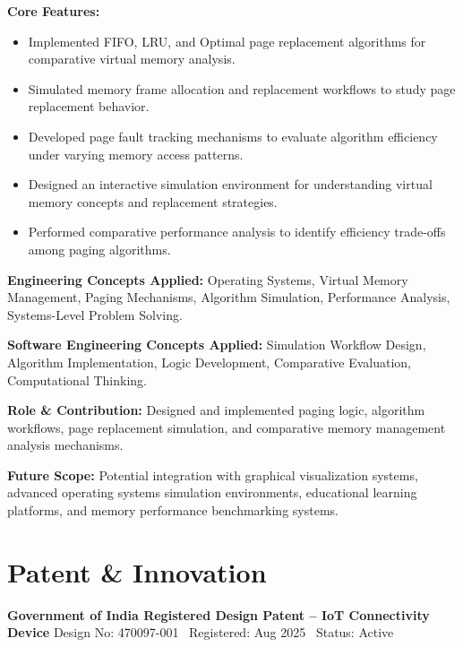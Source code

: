 \documentclass[a4paper,11pt]{article}
\newcommand{\resumeProject}[2]{
\textbf{#1} \hfill {\small #2}
}
\begin{document}
\textbf{Core Features:}
\begin{itemize}

    \item Implemented FIFO, LRU, and Optimal page replacement algorithms for comparative virtual memory analysis.

    \item Simulated memory frame allocation and replacement workflows to study page replacement behavior.

    \item Developed page fault tracking mechanisms to evaluate algorithm efficiency under varying memory access patterns.

    \item Designed an interactive simulation environment for understanding virtual memory concepts and replacement strategies.

    \item Performed comparative performance analysis to identify efficiency trade-offs among paging algorithms.

\end{itemize}

\textbf{Engineering Concepts Applied:}
Operating Systems, Virtual Memory Management, Paging Mechanisms, Algorithm Simulation, Performance Analysis, Systems-Level Problem Solving.

\textbf{Software Engineering Concepts Applied:}
Simulation Workflow Design, Algorithm Implementation, Logic Development, Comparative Evaluation, Computational Thinking.

\textbf{Role \& Contribution:}
Designed and implemented paging logic, algorithm workflows, page replacement simulation, and comparative memory management analysis mechanisms.

\textbf{Future Scope:}
Potential integration with graphical visualization systems, advanced operating systems simulation environments, educational learning platforms, and memory performance benchmarking systems.










\section{Patent \& Innovation}

\resumeProject
{Government of India Registered Design Patent -- IoT Connectivity Device}
{Design No: 470097-001 \textbar\ Registered: Aug 2025 \textbar\ Status: Active}
\end{document}
